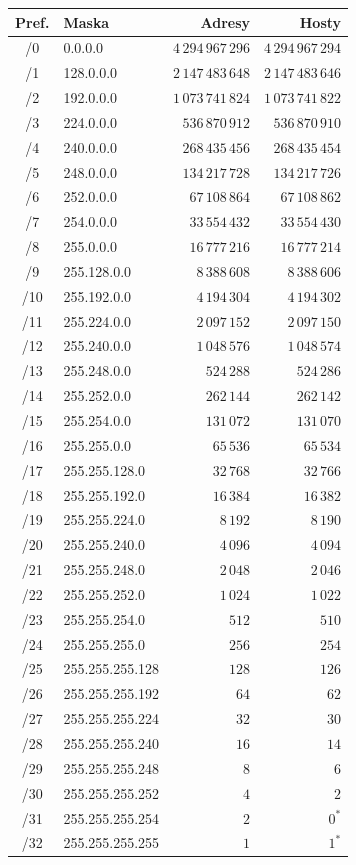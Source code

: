 \documentclass[10pt,a5paper,twoside]{article}
\renewcommand{\arraystretch}{0.94}
\begin{document}
{\scriptsize
\setlength{\tabcolsep}{2pt}
\renewcommand{\arraystretch}{0.9}
\begin{tabular}{@{}c l r r@{}}
\toprule
Pref. & Maska & Adresy & Hosty \\
\midrule
/0 & 0.0.0.0 & \(4\,294\,967\,296\) & \(4\,294\,967\,294\) \\
/1 & 128.0.0.0 & \(2\,147\,483\,648\) & \(2\,147\,483\,646\) \\
/2 & 192.0.0.0 & \(1\,073\,741\,824\) & \(1\,073\,741\,822\) \\
/3 & 224.0.0.0 & \(536\,870\,912\) & \(536\,870\,910\) \\
/4 & 240.0.0.0 & \(268\,435\,456\) & \(268\,435\,454\) \\
/5 & 248.0.0.0 & \(134\,217\,728\) & \(134\,217\,726\) \\
/6 & 252.0.0.0 & \(67\,108\,864\) & \(67\,108\,862\) \\
/7 & 254.0.0.0 & \(33\,554\,432\) & \(33\,554\,430\) \\
/8 & 255.0.0.0 & \(16\,777\,216\) & \(16\,777\,214\) \\
/9 & 255.128.0.0 & \(8\,388\,608\) & \(8\,388\,606\) \\
/10 & 255.192.0.0 & \(4\,194\,304\) & \(4\,194\,302\) \\
/11 & 255.224.0.0 & \(2\,097\,152\) & \(2\,097\,150\) \\
/12 & 255.240.0.0 & \(1\,048\,576\) & \(1\,048\,574\) \\
/13 & 255.248.0.0 & \(524\,288\) & \(524\,286\) \\
/14 & 255.252.0.0 & \(262\,144\) & \(262\,142\) \\
/15 & 255.254.0.0 & \(131\,072\) & \(131\,070\) \\
/16 & 255.255.0.0 & \(65\,536\) & \(65\,534\) \\
/17 & 255.255.128.0 & \(32\,768\) & \(32\,766\) \\
/18 & 255.255.192.0 & \(16\,384\) & \(16\,382\) \\
/19 & 255.255.224.0 & \(8\,192\) & \(8\,190\) \\
/20 & 255.255.240.0 & \(4\,096\) & \(4\,094\) \\
/21 & 255.255.248.0 & \(2\,048\) & \(2\,046\) \\
/22 & 255.255.252.0 & \(1\,024\) & \(1\,022\) \\
/23 & 255.255.254.0 & \(512\) & \(510\) \\
/24 & 255.255.255.0 & \(256\) & \(254\) \\
/25 & 255.255.255.128 & \(128\) & \(126\) \\
/26 & 255.255.255.192 & \(64\) & \(62\) \\
/27 & 255.255.255.224 & \(32\) & \(30\) \\
/28 & 255.255.255.240 & \(16\) & \(14\) \\
/29 & 255.255.255.248 & \(8\) & \(6\) \\
/30 & 255.255.255.252 & \(4\) & \(2\) \\
/31 & 255.255.255.254 & \(2\) & \(0^\ast\) \\
/32 & 255.255.255.255 & \(1\) & \(1^\ast\) \\
\bottomrule
\end{tabular}
}
\end{document}
